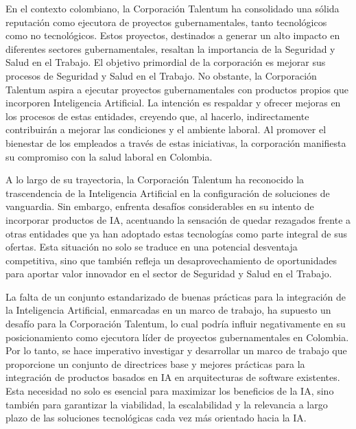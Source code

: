 
En el contexto colombiano, la Corporación Talentum ha consolidado una sólida reputación como ejecutora de proyectos gubernamentales, tanto tecnológicos como no tecnológicos. Estos proyectos, destinados a generar un alto impacto en diferentes sectores gubernamentales, resaltan la importancia de la Seguridad y Salud en el Trabajo. El objetivo primordial de la corporación es mejorar sus procesos de Seguridad y Salud en el Trabajo. No obstante, la Corporación Talentum aspira a ejecutar proyectos gubernamentales con productos propios que incorporen Inteligencia Artificial. La intención es respaldar y ofrecer mejoras en los procesos de estas entidades, creyendo que, al hacerlo, indirectamente contribuirán a mejorar las condiciones y el ambiente laboral. Al promover el bienestar de los empleados a través de estas iniciativas, la corporación manifiesta su compromiso con la salud laboral en Colombia.

A lo largo de su trayectoria, la Corporación Talentum ha reconocido la trascendencia de la Inteligencia Artificial en la configuración de soluciones de vanguardia. Sin embargo, enfrenta desafíos considerables en su intento de incorporar productos de IA, acentuando la sensación de quedar rezagados frente a otras entidades que ya han adoptado estas tecnologías como parte integral de sus ofertas. Esta situación no solo se traduce en una potencial desventaja competitiva, sino que también refleja un desaprovechamiento de oportunidades para aportar valor innovador en el sector de Seguridad y Salud en el Trabajo. 

La falta de un conjunto estandarizado de buenas pr\'acticas para la integración de la Inteligencia Artificial, enmarcadas en un marco de trabajo, ha supuesto un desafío para la Corporación Talentum, lo cual podría influir negativamente en su posicionamiento como ejecutora líder de proyectos gubernamentales en Colombia. Por lo tanto, se hace imperativo investigar y desarrollar un marco de trabajo que proporcione un conjunto de directrices base y mejores prácticas para la integración de productos basados en IA en arquitecturas de software existentes. Esta necesidad no solo es esencial para maximizar los beneficios de la IA, sino también para garantizar la viabilidad, la escalabilidad y la relevancia a largo plazo de las soluciones tecnológicas cada vez más orientado hacia la IA.

